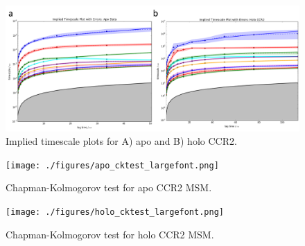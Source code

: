 \begin{figure}[htbp]
\begin{center}
\includegraphics[width=\textwidth]{./figures/its.png}
\caption[Implied timescale plots of apo and holo CCR2 MSMs]{Implied timescale plots for A) apo and B) holo CCR2.}
\label{fig:its}
\end{center}
\end{figure}

\begin{figure}[htbp]
\begin{center}
\texttt{[image: ./figures/apo\_cktest\_largefont.png]}
\caption{Chapman-Kolmogorov test for apo CCR2 MSM.}
\label{fig:apo_its_ck}
\end{center}
\end{figure}

\begin{figure}[htbp]
  \begin{center}
  \texttt{[image: ./figures/holo\_cktest\_largefont.png]}
 \caption{Chapman-Kolmogorov test for holo CCR2 MSM.}
  \label{fig:holo_its_ck}
\end{center}
\end{figure}

